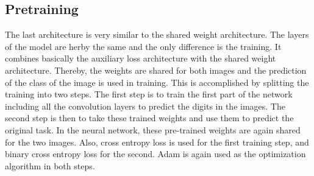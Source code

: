 \documentclass[12pt]{article}
\begin{document}
\subsection{Pretraining}
The last architecture is very similar to the shared weight architecture.
The layers of the model are herby the same and the only difference is the training.
It combines basically the auxiliary loss architecture with the shared weight architecture.
Thereby, the weights are shared for both images and the prediction of the class of the image is used in training.
This is accomplished by splitting the training into two steps.
The first step is to train the first part of the network including all the convolution layers to predict the digits in the images.
The second step is then to take these trained weights and use them to predict the original task.
In the neural network, these pre-trained weights are again shared for the two images.
Also, cross entropy loss is used for the first training step, and binary cross entropy loss for the second.
Adam is again used as the optimization algorithm in both steps. 
\end{document}

